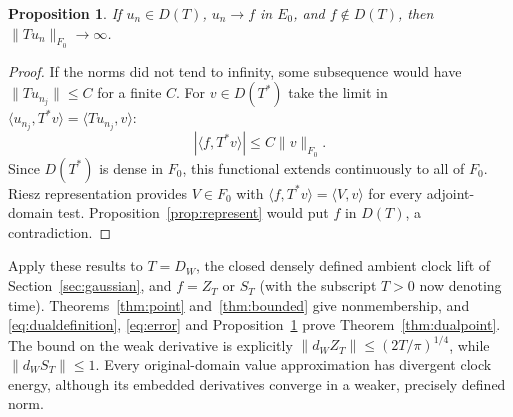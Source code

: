 \documentclass[11pt]{article}
\newtheorem{proposition}[theorem]{Proposition}
\begin{document}
\begin{proposition}\label{prop:escape}
If $u_n\in D(T)$, $u_n\to f$ in $E_0$, and
$f\notin D(T)$, then $\|Tu_n\|_{F_0}\to\infty$.
\end{proposition}
\begin{proof}
If the norms did not tend to infinity, some subsequence
would have $\|Tu_{n_j}\|\leq C$ for a finite $C$.
For $v\in D(T^*)$ take the limit in
$\langle u_{n_j},T^*v\rangle=\langle Tu_{n_j},v\rangle$:
\[
 |\langle f,T^*v\rangle|\leq C\|v\|_{F_0}.
\]
Since $D(T^*)$ is dense in $F_0$, this functional
extends continuously to all of $F_0$. Riesz
representation provides $V\in F_0$ with
$\langle f,T^*v\rangle=\langle V,v\rangle$ for
every adjoint-domain test. Proposition~\ref{prop:represent}
would put $f$ in $D(T)$, a contradiction.
\end{proof}

Apply these results to $T=D_W$, the closed densely
defined ambient clock lift of Section~\ref{sec:gaussian},
and $f=Z_T$ or $S_T$ (with the subscript $T>0$ now denoting time).
Theorems~\ref{thm:point} and~\ref{thm:bounded} give nonmembership, and
\eqref{eq:dualdefinition}, \eqref{eq:error} and
Proposition~\ref{prop:escape} prove
Theorem~\ref{thm:dualpoint}. The bound on the weak
derivative is explicitly
$\|d_WZ_T\|\leq(2T/\pi)^{1/4}$, while
$\|d_WS_T\|\leq1$.
Every original-domain value approximation has divergent
clock energy, although its embedded derivatives converge
in a weaker, precisely defined norm.
\end{document}
